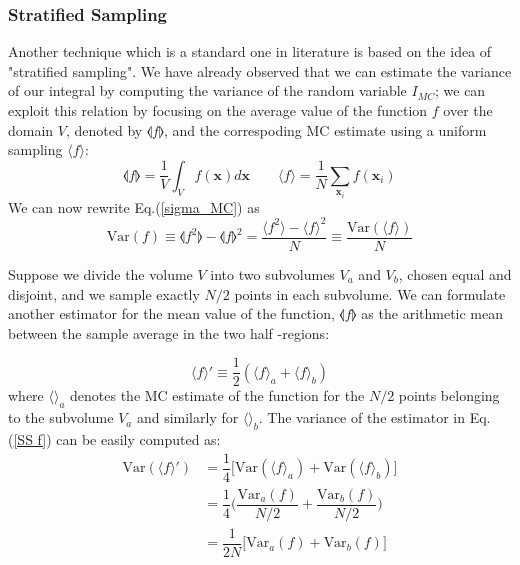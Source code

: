 \documentclass[../main/main.tex]{subfiles}
\begin{document}
\subsubsection{Stratified Sampling}
Another technique which is a standard one in literature is based on the idea of  "stratified sampling".
We have already observed that we can estimate the variance of our integral by computing the variance of the random variable $I_{MC}$; we can exploit this relation by focusing on the average value of the function $f$ over the domain $V$, denoted by $\llangle  f \rrangle $, and the correspoding MC estimate using a uniform sampling $ \langle f \rangle$:
\begin{equation}
	\llangle  f \rrangle = \frac{1}{V} \int_V f(\textbf{x}) d\textbf{x} \quad \quad 
	\langle f \rangle = \frac{1}{N} \sum_{\textbf{x}_i} f(\textbf{x}_i)
\end{equation}
We can now rewrite Eq.(\ref{sigma_MC}) as  
\begin{equation}
	\text{Var}( f ) \equiv \llangle f^2 \rrangle - \llangle f \rrangle ^2 = \frac{\langle f^2 \rangle - \langle f \rangle^2}{N} \equiv \frac{\text{Var}(\langle f \rangle )}{N}
\end{equation}

Suppose we divide the volume $V$ into two subvolumes $V_a$  and $V_b$, chosen equal and disjoint, and we sample exactly $N/2$ points in each subvolume. We can formulate another estimator for the mean value of the function, $\llangle f \rrangle $ as the arithmetic mean between the sample average
in the two half -regions:

\begin{equation}
	\label {SS f}
	\langle f  \rangle ' \equiv \frac{1}{2} (  \langle f \rangle_a + \langle f \rangle_b )
\end{equation}
where $\langle \rangle_a$ denotes the MC estimate of the function for the $N/2$ points belonging to the subvolume $V_a$ and similarly for $\langle \rangle_b$.
The variance of the estimator in Eq.(\ref{SS f}) can be easily computed as:
\begin{eqnarray}
	\text{Var}(\langle f \rangle ') &= \dfrac{1}{4}  \big[  \text{Var}(\langle f \rangle_a) +\text{Var}(\langle f \rangle_b)  \big]  \\
	&= \dfrac{1}{4} \bigg(  \dfrac{\text{Var}_a(f)}{N/2} +\dfrac{\text{Var}_b(f)}{N/2} \bigg) \\
	&= \dfrac{1}{2N} \big[ \text{Var}_a(f) + \text{Var}_b(f)\big] \label{var_stratified}
	\label{ SS var}
\end{eqnarray}
\end{document}
